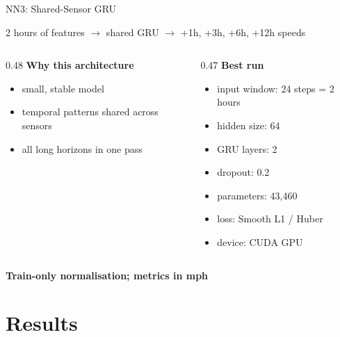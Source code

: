 \documentclass[aspectratio=169]{beamer}
\begin{document}
\begin{frame}{NN3: Shared-Sensor GRU}
\small
\begin{center}
\large
2 hours of features $\rightarrow$ shared GRU $\rightarrow$ +1h, +3h, +6h, +12h speeds
\end{center}

\vspace{0.4em}
\begin{columns}[T,totalwidth=\textwidth]
\begin{column}{0.48\textwidth}
\textbf{Why this architecture}
\begin{itemize}
  \item small, stable model
  \item temporal patterns shared across sensors
  \item all long horizons in one pass
\end{itemize}
\end{column}
\begin{column}{0.47\textwidth}
\textbf{Best run}
\begin{itemize}
  \item input window: 24 steps = 2 hours
  \item hidden size: 64
  \item GRU layers: 2
  \item dropout: 0.2
  \item parameters: 43,460
  \item loss: Smooth L1 / Huber
  \item device: CUDA GPU
\end{itemize}
\end{column}
\end{columns}

\vspace{0.6em}
\centering
\textbf{Train-only normalisation; metrics in mph}
\end{frame}

\section{Results}
\end{document}
